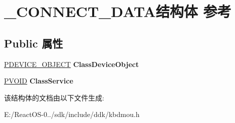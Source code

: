 \hypertarget{struct___c_o_n_n_e_c_t___d_a_t_a}{}\section{\+\_\+\+C\+O\+N\+N\+E\+C\+T\+\_\+\+D\+A\+T\+A结构体 参考}
\label{struct___c_o_n_n_e_c_t___d_a_t_a}
\subsection*{Public 属性}
\begin{DoxyCompactItemize}
\item 
\mbox{\label{struct___c_o_n_n_e_c_t___d_a_t_a_ac863d055e8996f256e7fb18f30c4ebec}} 
\hyperlink{struct___d_e_v_i_c_e___o_b_j_e_c_t}{P\+D\+E\+V\+I\+C\+E\+\_\+\+O\+B\+J\+E\+CT} {\bfseries Class\+Device\+Object}
\item 
\mbox{\label{struct___c_o_n_n_e_c_t___d_a_t_a_a2d0d94773d72e632de23ffdb858037b8}} 
\hyperlink{interfacevoid}{P\+V\+O\+ID} {\bfseries Class\+Service}
\end{DoxyCompactItemize}


该结构体的文档由以下文件生成\+:\begin{DoxyCompactItemize}
\item 
E\+:/\+React\+O\+S-\/0../sdk/include/ddk/kbdmou.\+h\end{DoxyCompactItemize}
